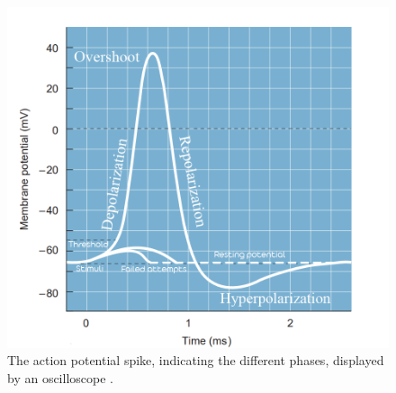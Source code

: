 \documentclass[class={myRUCProject}, crop=false]{standalone}
\begin{document}
\begin{figure}[H]
  \centering
  \includegraphics[width=0.6\linewidth]{Pictures/Svet/Untitled-1.png}
  \caption{The action potential spike, indicating the different phases, displayed by an oscilloscope \cite{wood1996neuroscience}.}\label{fig:AP}
\end{figure}
\end{document}
